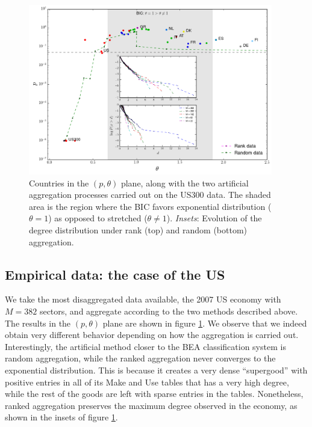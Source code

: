 \begin{figure}[!ht]
  \centering
  \includegraphics[width=0.95\textwidth]{figs_io/theta_pval_data_agg_w_inset.png}
  \caption{Countries in the $(p, \theta)$ plane, along with the two
    artificial aggregation processes carried out on the US300 data. The shaded
    area is the region where the BIC favors exponential distribution
    ($\theta = 1$) as opposed to stretched ($\theta \neq
    1$).
    \emph{Insets}: Evolution of the degree distribution under rank
    (top) and random (bottom) aggregation.}
  \label{fig:theta_pval_data}
\end{figure}


\subsection{Empirical data: the case of the US}

We take the most disaggregated data available, the 2007 US economy
with $M=382$ sectors, and aggregate according to the two methods
described above.  The results in the $(p, \theta)$ plane
are shown in figure \ref{fig:theta_pval_data}. We observe that we indeed obtain very different behavior depending on how the aggregation is carried out. Interestingly, the artificial method closer to the BEA classification system is random aggregation, while the ranked aggregation never converges to the exponential distribution. This is
because it creates a very dense ``supergood'' with positive entries in
all of its Make and Use tables that has a very high degree, while the
rest of the goods are left with sparse entries in the
tables. Nonetheless, ranked aggregation preserves the maximum degree
observed in the economy, as shown in the insets of figure
\ref{fig:theta_pval_data}.

